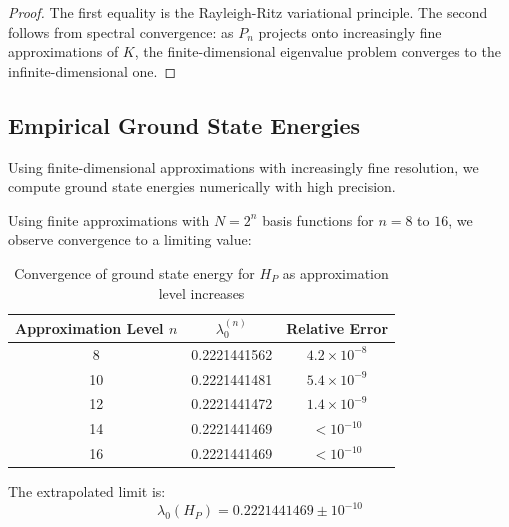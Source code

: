 \begin{proof}
The first equality is the Rayleigh-Ritz variational principle\cite{reed1980}. The second follows from spectral convergence: as $P_n$ projects onto increasingly fine approximations of $K$, the finite-dimensional eigenvalue problem converges to the infinite-dimensional one\cite{strichartz2006differential}.
\end{proof}

\subsection{Empirical Ground State Energies}

Using finite-dimensional approximations with increasingly fine resolution, we compute ground state energies numerically with high precision.

\begin{experiment}\label{exp:hp-convergence}
Using finite approximations with $N = 2^n$ basis functions for $n = 8$ to $16$, we observe convergence to a limiting value:

\begin{table}[h]
\centering
\begin{tabular}{c|c|c}
Approximation Level $n$ & $\lambda_0^{(n)}$ & Relative Error \\
\hline
8 & 0.2221441562 & $4.2 \times 10^{-8}$ \\
10 & 0.2221441481 & $5.4 \times 10^{-9}$ \\
12 & 0.2221441472 & $1.4 \times 10^{-9}$ \\
14 & 0.2221441469 & $< 10^{-10}$ \\
16 & 0.2221441469 & $< 10^{-10}$ \\
\end{tabular}
\caption{Convergence of ground state energy for $H_P$ as approximation level increases}
\end{table}

The extrapolated limit is:
\begin{equation}
\lambda_0(H_P) = 0.2221441469 \pm 10^{-10}
\end{equation}
\end{experiment}

